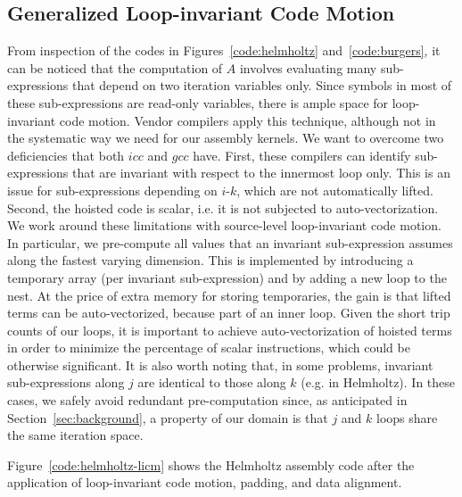 \documentclass[conference]{IEEEtran}
\begin{document}
\subsection{Generalized Loop-invariant Code Motion}
\label{sec:code-transf-licm}
From inspection of the codes in Figures~\ref{code:helmholtz} and~\ref{code:burgers}, it can be noticed that the computation of $A$ involves evaluating many sub-expressions that depend on two iteration variables only. Since symbols in most of these sub-expressions are read-only variables, there is ample space for loop-invariant code motion. Vendor compilers apply this technique, although not in the systematic way we need for our assembly kernels. We want to overcome two deficiencies that both $icc$ and $gcc$ have. First, these compilers can identify sub-expressions that are invariant with respect to the innermost loop only. This is an issue for sub-expressions depending on $i$-$k$, which are not automatically lifted. Second, the hoisted code is scalar, i.e. it is not subjected to auto-vectorization. We work around these limitations with source-level loop-invariant code motion. In particular, we pre-compute all values that an invariant sub-expression assumes along the fastest varying dimension. This is implemented by introducing a temporary array (per invariant sub-expression) and by adding a new loop to the nest. At the price of extra memory for storing temporaries, the gain is that lifted terms can be auto-vectorized, because part of an inner loop. Given the short trip counts of our loops, it is important to achieve auto-vectorization of hoisted terms in order to minimize the percentage of scalar instructions, which could be otherwise significant. It is also worth noting that, in some problems, invariant sub-expressions along $j$ are identical to those along $k$ (e.g. in Helmholtz). In these cases, we safely avoid redundant pre-computation since, as anticipated in Section~\ref{sec:background}, a property of our domain is that $j$ and $k$ loops share the same iteration space.

Figure~\ref{code:helmholtz-licm} shows the Helmholtz assembly code after the application of loop-invariant code motion, padding, and data alignment.

\end{document}
